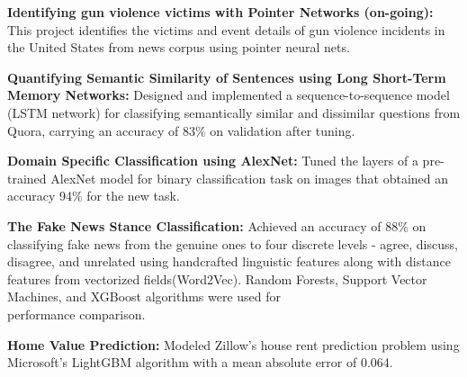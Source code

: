 \begin{cventries}
\vspace{-5mm}
  \cventry
    {}
    {}
    {}
    {}
    {
      \begin{cvitems}
      \item {{ \textbf{Identifying gun violence victims with Pointer Networks (on-going):} This project identifies the victims and event details of gun violence incidents in the United States from news corpus using pointer neural nets.}}
      \item {{ \textbf{Quantifying Semantic Similarity of Sentences using Long Short-Term Memory Networks:} Designed and implemented a sequence-to-sequence model (LSTM network) for classifying semantically similar and dissimilar questions from Quora, carrying an accuracy of 83\% on validation after tuning.}}
      \item {{\textbf{Domain Specific Classification using AlexNet:} Tuned the layers of a pre-trained AlexNet model for binary classification task on images that obtained an accuracy 94\% for the new task.}}
      \item { \textbf{The Fake News Stance Classification:} Achieved an accuracy of 88\% on classifying fake news from the genuine ones to four discrete levels - agree, discuss, disagree, and unrelated using handcrafted linguistic features along with distance features from vectorized fields(Word2Vec). Random Forests, Support Vector Machines, and XGBoost algorithms were used for \\ performance comparison.}
      \item { \textbf{Home Value Prediction:} Modeled Zillow's house rent prediction problem using Microsoft's LightGBM algorithm with a mean absolute error of 0.064.}
      \end{cvitems}
    }
\end{cventries}
